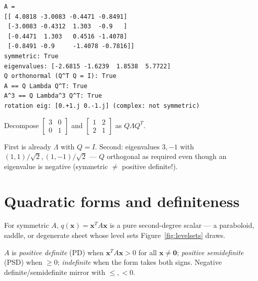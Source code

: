 \begin{lstlisting}[caption={Output of the spectral check. Notice
\texttt{eigh} (the symmetric specialist) returns all-real eigenvalues and
a $Q$ that is orthonormal to machine precision --- and powers collapse to
$\Lambda^{k}$.}]
A =
[[ 4.0818 -3.0083 -0.4471 -0.8491]
 [-3.0083 -0.4312  1.303  -0.9   ]
 [-0.4471  1.303   0.4516 -1.4078]
 [-0.8491 -0.9     -1.4078 -0.7816]]
symmetric: True
eigenvalues: [-2.6815 -1.6239  1.8538  5.7722]
Q orthonormal (Q^T Q = I): True
A == Q Lambda Q^T: True
A^3 == Q Lambda^3 Q^T: True
rotation eig: [0.+1.j 0.-1.j] (complex: not symmetric)
\end{lstlisting}

\begin{exercise}[easy]
Decompose $\begin{bmatrix}3&0\\0&1\end{bmatrix}$ and
$\begin{bmatrix}1&2\\2&1\end{bmatrix}$ as $Q\Lambda Q^{T}$.
\begin{solution}
First is already $\Lambda$ with $Q=I$. Second: eigenvalues $3,-1$ with
$(1,1)/\sqrt2,(1,-1)/\sqrt2$ --- $Q$ orthogonal as required even though an
eigenvalue is negative (symmetric $\ne$ positive definite!).
\end{solution}
\end{exercise}

\section{Quadratic forms and definiteness}\label{sec:quadform}

\begin{definition}
For symmetric $A$, $q(\mathbf x)=\mathbf x^{T}A\mathbf x$ is a pure
second-degree scalar --- a paraboloid, saddle, or degenerate sheet whose
level sets Figure~\ref{fig:levelsets} draws.
\end{definition}

\begin{definition}[Definiteness]
$A$ is \emph{positive definite} (PD) when $\mathbf x^{T}A\mathbf x>0$ for
all $\mathbf x\ne\mathbf0$; \emph{positive semidefinite} (PSD) when
$\ge0$; \emph{indefinite} when the form takes both signs. Negative
definite/semidefinite mirror with $\le,<0$.
\end{definition}

